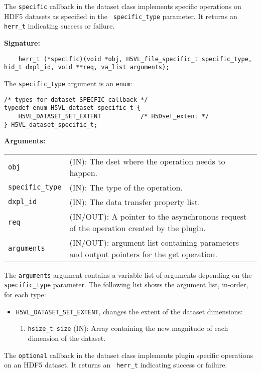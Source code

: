 The {\tt specific} callback in the dataset class implements specific operations on HDF5 datasets as specified in the {\tt
  specific\_type} parameter. It returns an {\tt herr\_t} indicating success or failure.

\textbf{Signature:}
\begin{lstlisting}
    herr_t (*specific)(void *obj, H5VL_file_specific_t specific_type, hid_t dxpl_id, void **req, va_list arguments);
\end{lstlisting}

The {\tt specific\_type} argument is an {\tt enum}:
\begin{lstlisting}
/* types for dataset SPECFIC callback */
typedef enum H5VL_dataset_specific_t {
    H5VL_DATASET_SET_EXTENT           /* H5Dset_extent */
} H5VL_dataset_specific_t;
\end{lstlisting}

\textbf{Arguments:}\\
\begin{tabular}{l p{10cm}}
  {\tt obj} & (IN): The dset  where the operation needs
  to happen.\\
  {\tt specific\_type} & (IN): The type of the operation.\\
  {\tt dxpl\_id} & (IN): The data transfer property list.\\
  {\tt req} & (IN/OUT): A pointer to the asynchronous request of the
  operation created by the plugin.\\
  {\tt arguments} & (IN/OUT): argument list containing parameters and
  output pointers for the get operation. \\
\end{tabular}

The {\tt arguments} argument contains a variable list of arguments
depending on the {\tt specific\_type} parameter. The following list shows
the argument list, in-order, for each type:

\begin{itemize}
\item {\tt H5VL\_DATASET\_SET\_EXTENT}, changes the extent of the dataset dimensions:
  \begin{enumerate}
  \item {\tt hsize\_t size} (IN): Array containing the new magnitude of each dimension of the dataset. 
  \end{enumerate}
\end{itemize}

The {\tt optional} callback in the dataset class implements plugin specific operations on an HDF5 dataset. It returns an {\tt
  herr\_t} indicating success or failure. 


